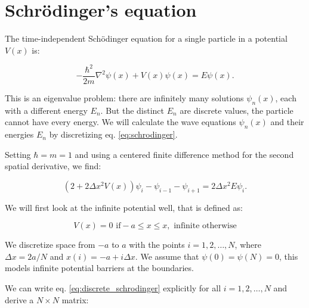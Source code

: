 \documentclass[a4paper]{article}
\begin{document}
\section{Schr\"odinger's equation}

The time-independent Sch\"odinger equation for a single particle in a potential $V(x)$ is:

\begin{equation} \label{eq:schrodinger}
    -\frac{\hbar^2}{2m} \nabla^2 \psi(x) + V(x) \psi(x) = E \psi(x).
\end{equation}

This is an eigenvalue problem: there are infinitely many solutions $\psi_n(x)$, each with a different energy $E_n$. But the distinct $E_n$ are discrete values, the particle cannot have every energy. We will calculate the wave equations $\psi_n(x)$ and their energies $E_n$ by discretizing eq. \ref{eq:schrodinger}.

Setting $\hbar = m = 1$ and using a centered finite difference method for the second spatial derivative, we find:

\begin{equation} \label{eq:discrete_schrodinger}
    (2 + 2 \Delta x^2 V(x)) \psi_i - \psi_{i-1} - \psi_{i+1} = 2 \Delta x^2 E \psi_i.
\end{equation}

We will first look at the infinite potential well, that is defined as:

\begin{equation} \label{eq:inf_pot} 
    V(x) = 0 \text{ if} -a \leq x \leq x, \text{ infinite otherwise}
\end{equation}

We discretize space from $-a$ to $a$ with the points $i = 1, 2, \dots, N$, where $\Delta x = 2 a/ N$ and $x(i) = -a + i  \Delta x$. We assume that $\psi(0) = \psi(N) = 0$, this models infinite potential barriers at the boundaries.

We can write eq. \ref{eq:discrete_schrodinger} explicitly for all $i = 1, 2, \dots, N$ and derive a $N \times N$ matrix:
\end{document}
